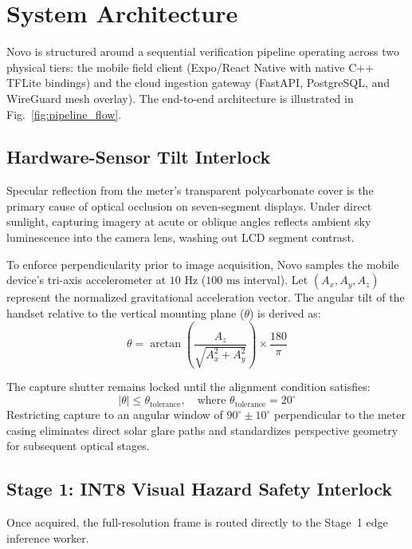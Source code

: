 \documentclass[conference]{IEEEtran}
\begin{document}
\section{System Architecture}
Novo is structured around a sequential verification pipeline operating across two physical tiers: the mobile field client (Expo/React Native with native C++ TFLite bindings) and the cloud ingestion gateway (FastAPI, PostgreSQL, and WireGuard mesh overlay). The end-to-end architecture is illustrated in Fig.~\ref{fig:pipeline_flow}.

\subsection{Hardware-Sensor Tilt Interlock}
Specular reflection from the meter's transparent polycarbonate cover is the primary cause of optical occlusion on seven-segment displays. Under direct sunlight, capturing imagery at acute or oblique angles reflects ambient sky luminescence into the camera lens, washing out LCD segment contrast.

To enforce perpendicularity prior to image acquisition, Novo samples the mobile device's tri-axis accelerometer at $10\text{~Hz}$ ($100\text{~ms}$ interval). Let $(A_x, A_y, A_z)$ represent the normalized gravitational acceleration vector. The angular tilt of the handset relative to the vertical mounting plane ($\theta$) is derived as:
\begin{equation}
\theta = \arctan\left( \frac{A_z}{\sqrt{A_x^2 + A_y^2}} \right) \times \frac{180}{\pi}
\label{eq:tilt}
\end{equation}

The capture shutter remains locked until the alignment condition satisfies:
\begin{equation}
|\theta| \le \theta_{\text{tolerance}}, \quad \text{where } \theta_{\text{tolerance}} = 20^\circ
\label{eq:tilt_gate}
\end{equation}
Restricting capture to an angular window of $90^\circ \pm 10^\circ$ perpendicular to the meter casing eliminates direct solar glare paths and standardizes perspective geometry for subsequent optical stages.

\subsection{Stage 1: INT8 Visual Hazard Safety Interlock}
Once acquired, the full-resolution frame is routed directly to the Stage~1 edge inference worker. 
\end{document}
